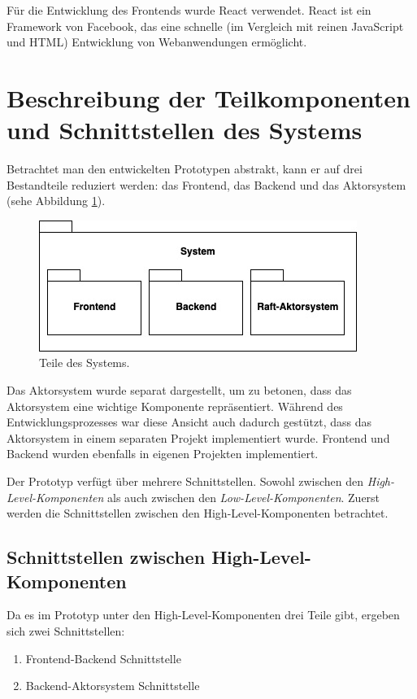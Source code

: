 Für die Entwicklung des Frontends wurde React verwendet. React ist ein Framework von Facebook, das eine schnelle (im Vergleich mit reinen JavaScript und HTML) Entwicklung von Webanwendungen ermöglicht.

\section{Beschreibung der Teilkomponenten und Schnittstellen des Systems}

Betrachtet man den entwickelten Prototypen abstrakt, kann er auf drei Bestandteile reduziert werden: das Frontend, das Backend und das Aktorsystem (sehe Abbildung \ref{fig:system}).

\begin{figure}
	\centering
	\includegraphics[width=0.7\linewidth]{images/7_system}
	\caption{Teile des Systems.}
	\label{fig:system}
\end{figure}

Das Aktorsystem wurde separat dargestellt, um zu betonen, dass das Aktorsystem eine wichtige Komponente repräsentiert. Während des Entwicklungsprozesses war diese Ansicht auch dadurch gestützt, dass das Aktorsystem in einem separaten Projekt implementiert wurde. Frontend und Backend wurden ebenfalls in eigenen Projekten implementiert.

Der Prototyp verfügt über mehrere Schnittstellen. Sowohl zwischen den \textit{High-Level-Komponenten} als auch zwischen den \textit{Low-Level-Komponenten}. Zuerst werden die Schnittstellen zwischen den High-Level-Komponenten betrachtet.

\subsection{Schnittstellen zwischen High-Level-Komponenten}

Da es im Prototyp unter den High-Level-Komponenten drei Teile gibt, ergeben sich zwei Schnittstellen:

\begin{enumerate}
	\item Frontend-Backend Schnittstelle
	
	\item Backend-Aktorsystem Schnittstelle
\end{enumerate}

